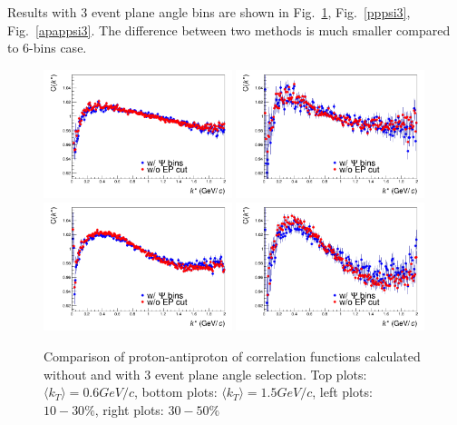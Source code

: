 Results with 3 event plane angle bins are shown in Fig.~\ref{pappsi3}, Fig.~\ref{pppsi3}, Fig.~\ref{apappsi3}. The difference between two methods is much smaller compared to 6-bins case.
\begin{figure}%
  \centering
  \includegraphics[width=0.49\textwidth]{cfPAPsemicentral_ptdcattcpsipidkT0c2}
  \includegraphics[width=0.49\textwidth]{cfPAPsemicentral_ptdcattcpsipidkT0c4}
  \includegraphics[width=0.49\textwidth]{cfPAPsemicentral_ptdcattcpsipidkT1c2}
  \includegraphics[width=0.49\textwidth]{cfPAPsemicentral_ptdcattcpsipidkT1c4}
  \caption{Comparison of proton-antiproton of correlation functions calculated without and with 3 event plane angle selection. Top plots: $\langle k_T \rangle = 0.6 GeV/c$, bottom plots: $\langle k_T \rangle = 1.5 GeV/c$, left plots: $10-30 \%$, right plots: $30-50 \%$}
  \label{pappsi3}
\end{figure}
